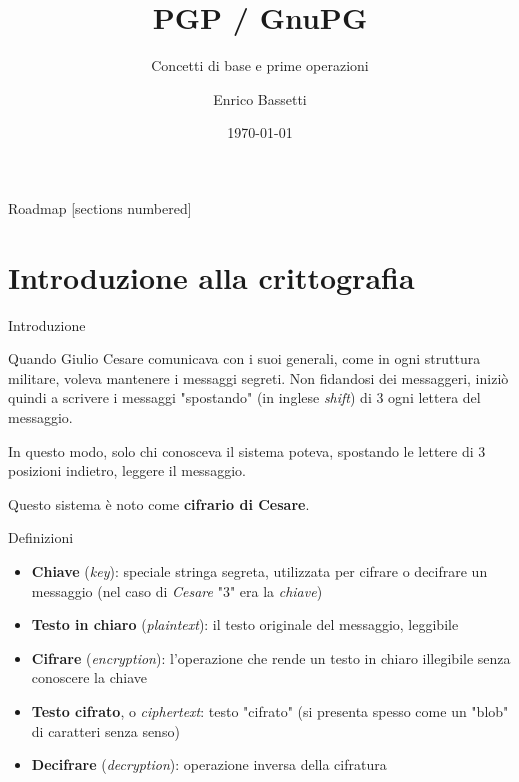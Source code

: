 \documentclass[10pt]{beamer}
\title{PGP / GnuPG}
\subtitle{Concetti di base e prime operazioni}
\date{\today}
\author{Enrico Bassetti}
\institute{Latina Linux User Group}
\begin{document}

\maketitle

\begin{frame}{Roadmap}
  [sections numbered]
  \tableofcontents[hideallsubsections]
\end{frame}

\section{Introduzione alla crittografia}

\begin{frame}[fragile]{Introduzione}

Quando Giulio Cesare comunicava con i suoi generali, come in ogni struttura
militare, voleva mantenere i messaggi segreti. Non fidandosi dei messaggeri,
iniziò quindi a scrivere i messaggi "spostando" (in inglese \textit{shift}) di 3
ogni lettera del messaggio.

In questo modo, solo chi conosceva il sistema poteva, spostando le lettere di
3 posizioni indietro, leggere il messaggio.

Questo sistema è noto come \textbf{cifrario di Cesare}.

\end{frame}

\begin{frame}[fragile]{Definizioni}
\begin{itemize}
\item \textbf{Chiave} (\textit{key}): speciale stringa segreta, utilizzata per cifrare o decifrare un messaggio (nel caso di \textit{Cesare} "3" era la \textit{chiave})
\item \textbf{Testo in chiaro} (\textit{plaintext}): il testo originale del messaggio, leggibile
\item \textbf{Cifrare} (\textit{encryption}): l'operazione che rende un testo in chiaro illegibile senza conoscere la chiave
\item \textbf{Testo cifrato}, o \textit{ciphertext}: testo "cifrato" (si presenta spesso come un "blob" di caratteri senza senso)
\item \textbf{Decifrare} (\textit{decryption}): operazione inversa della cifratura
\end{itemize}
\end{frame}
\end{document}
